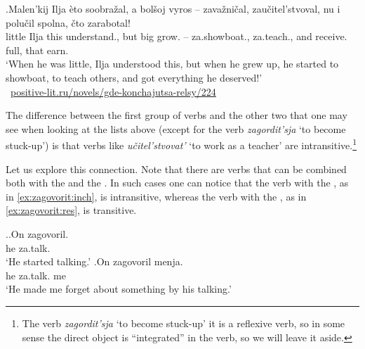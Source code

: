 \exg.\label{ex:zateach}Malen'kij Ilja \`{e}to soobra\v{z}al, a bol\v{s}oj vyros -- zava\v{z}ni\v{c}al, zau\v{c}itel'stvoval, {nu i} polu\v{c}il spolna, \v{c}to zarabotal!\\
little Ilja this understand., but big grow. -- za.showboat., za.teach., {and} receive. full, that earn.\\
\trans `When he was little, Ilja understood this, but when he grew up, he started to showboat, to teach others, and got everything he deserved!'\\\hbox{}\hfill\hbox{
\url{positive-lit.ru/novels/gde-konchajutsa-relsy/224}}

The difference between the first group of verbs and the other two that one may see when looking at the lists above (except for the verb \textit{zagordit'sja} `to become stuck-up') is that verbs like \textit{u\v{c}itel'stvovat'} `to work as a teacher' are intransitive.\footnote{The verb \textit{zagordit'sja} `to become stuck-up' it is a reflexive verb, so in some sense the direct object is ``integrated'' in the verb, so we will leave it aside.}

Let us explore this connection. Note that there are verbs that can be combined both with the  and the  . In such cases one can notice that the verb with the  , as in \ref{ex:zagovorit:inch}, is intransitive, whereas the verb with the  , as in \ref{ex:zagovorit:res}, is transitive.

\ex.\ag.\label{ex:zagovorit:inch}On zagovoril.\\
he za.talk.\\
\trans `He started talking.'
\bg.\label{ex:zagovorit:res}On zagovoril menja.\\
he za.talk. me\\
\trans `He made me forget about something by his talking.'
 
